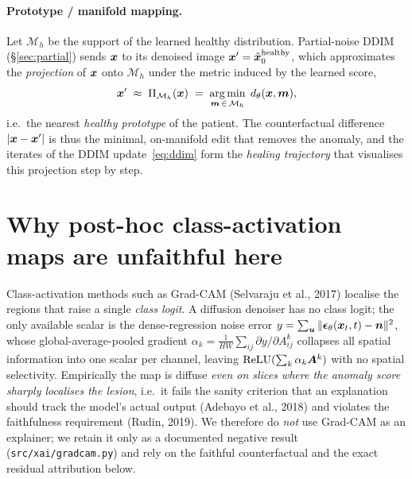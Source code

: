 \paragraph{Prototype / manifold mapping.} Let $\mathcal M_h$ be the support of the
learned healthy distribution. Partial-noise DDIM (\S\ref{sec:partial}) sends $\bm{x}$
to its denoised image $\bm{x}'=\hat{\bm{x}}_0^{\text{healthy}}$, which approximates the
\emph{projection} of $\bm{x}$ onto $\mathcal M_h$ under the metric induced by the
learned score,
\begin{equation}
\bm{x}'\;\approx\;\Pi_{\mathcal M_h}(\bm{x})
\;=\;\operatorname*{arg\,min}_{\bm m\,\in\,\mathcal M_h}\; d_\theta(\bm{x},\bm m),
\label{eq:prototype}
\end{equation}
i.e.\ the nearest \emph{healthy prototype} of the patient. The counterfactual
difference $|\bm{x}-\bm{x}'|$ is thus the minimal, on-manifold edit that removes the
anomaly, and the iterates of the DDIM update~\eqref{eq:ddim} form the
\emph{healing trajectory} that visualises this projection step by step.

\section{Why post-hoc class-activation maps are unfaithful here}
Class-activation methods such as Grad-CAM (Selvaraju et al., 2017) localise the
regions that raise a single \emph{class logit}. A diffusion denoiser has no class
logit; the only available scalar is the dense-regression noise error
$y=\sum_{\bm u}\|\bm{\epsilon}_\theta(\bm{x}_t,t)-\bm n\|^2$, whose global-average-pooled
gradient $\alpha_k=\frac{1}{HW}\sum_{ij}\partial y/\partial A^k_{ij}$ collapses all
spatial information into one scalar per channel, leaving
$\operatorname{ReLU}(\sum_k\alpha_k\bm A^k)$ with no spatial selectivity. Empirically the map is
diffuse \emph{even on slices where the anomaly score sharply localises the lesion},
i.e.\ it fails the sanity criterion that an explanation should track the model's
actual output (Adebayo et al., 2018) and violates the faithfulness requirement
(Rudin, 2019). We therefore do \emph{not} use Grad-CAM as an explainer; we retain
it only as a documented negative result (\texttt{src/xai/gradcam.py}) and rely on
the faithful counterfactual and the exact residual attribution below.

